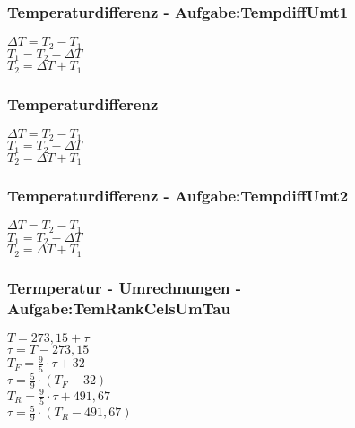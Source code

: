 \subsubsection{Temperaturdifferenz - Aufgabe:TempdiffUmt1} 
\begin{minipage}{0.45\textwidth} 
$ \Delta T = T_{2}  - T_{1} $\\ 
$ T_{1}  = T_{2}  - \Delta T $\\ 
$ T_{2}  = \Delta T + T_{1} $\\ 
\end{minipage} 
\begin{minipage}{0.45\textwidth} 
 
\end{minipage} 
\subsubsection{Temperaturdifferenz} 
\begin{minipage}{0.45\textwidth} 
$ \Delta T = T_{2}  - T_{1} $\\ 
$ T_{1}  = T_{2}  - \Delta T $\\ 
$ T_{2}  = \Delta T + T_{1} $\\ 
\end{minipage} 
\begin{minipage}{0.45\textwidth} 
 
\end{minipage} 
\subsubsection{Temperaturdifferenz - Aufgabe:TempdiffUmt2} 
\begin{minipage}{0.45\textwidth} 
$ \Delta T = T_{2}  - T_{1} $\\ 
$ T_{1}  = T_{2}  - \Delta T $\\ 
$ T_{2}  = \Delta T + T_{1} $\\ 
\end{minipage} 
\begin{minipage}{0.45\textwidth} 
 
\end{minipage} 
\subsubsection{Termperatur - Umrechnungen - Aufgabe:TemRankCelsUmTau} 
\begin{minipage}{0.45\textwidth} 
$ T = 273,15 + \tau $\\ 
$ \tau  = T-273,15 $\\ 
$ T_{F}  = \frac{9}{5}\cdot \tau  +32 $\\ 
$ \tau  = \frac{5}{9}\cdot (T_{F}  - 32) $\\ 
$ T_{R}  = \frac{9}{5}\cdot \tau  + 491,67 $\\ 
$ \tau  = \frac{5}{9}\cdot (T_{R}  - 491,67) $\\ 
\end{minipage} 
\begin{minipage}{0.45\textwidth} 
 
\end{minipage} 
